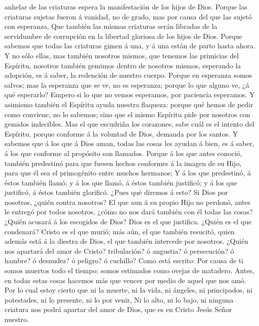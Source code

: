 anhelar de las criaturas espera la manifestación de los hijos de Dios.
 Porque las criaturas sujetas fueron á vanidad, no de
grado, mas por causa del que las sujetó con esperanza, 
Que también las mismas criaturas serán libradas de la servidumbre de
corrupción en la libertad gloriosa de los hijos de Dios. 
Porque sabemos que todas las criaturas gimen á una, y á una están de
parto hasta ahora.  Y no sólo ellas, mas también nosotros
mismos, que tenemos las primicias del Espíritu, nosotros también gemimos
dentro de nosotros mismos, esperando la adopción, es á saber, la
redención de nuestro cuerpo.  Porque en esperanza somos
salvos; mas la esperanza que se ve, no es esperanza; porque lo que
alguno ve, ¿á qué esperarlo?  Empero si lo que no vemos
esperamos, por paciencia esperamos.  Y asimismo también
el Espíritu ayuda nuestra flaqueza: porque qué hemos de pedir como
conviene, no lo sabemos; sino que el mismo Espíritu pide por nosotros
con gemidos indecibles.  Mas el que escudriña los
corazones, sabe cuál es el intento del Espíritu, porque conforme á la
voluntad de Dios, demanda por los santos.  Y sabemos que
á los que á Dios aman, todas las cosas les ayudan á bien, es á saber, á
los que conforme al propósito son llamados.  Porque á los
que antes conoció, también predestinó para que fuesen hechos conformes á
la imagen de su Hijo, para que él sea el primogénito entre muchos
hermanos;  Y á los que predestinó, á éstos también llamó;
y á los que llamó, á éstos también justificó; y á los que justificó, á
éstos también glorificó.  ¿Pues qué diremos á esto? Si
Dios por nosotros, ¿quién contra nosotros?  El que aun á
su propio Hijo no perdonó, antes le entregó por todos nosotros, ¿cómo no
nos dará también con él todas las cosas?  ¿Quién acusará
á los escogidos de Dios? Dios es el que justifica. 
¿Quién es el que condenará? Cristo es el que murió; más aún, el que
también resucitó, quien además está á la diestra de Dios, el que también
intercede por nosotros.  ¿Quién nos apartará del amor de
Cristo? tribulación? ó angustia? ó persecución? ó hambre? ó desnudez? ó
peligro? ó cuchillo?  Como está escrito: Por causa de ti
somos muertos todo el tiempo: somos estimados como ovejas de matadero.
 Antes, en todas estas cosas hacemos más que vencer por
medio de aquel que nos amó.  Por lo cual estoy cierto que
ni la muerte, ni la vida, ni ángeles, ni principados, ni potestades, ni
lo presente, ni lo por venir,  Ni lo alto, ni lo bajo, ni
ninguna criatura nos podrá apartar del amor de Dios, que es en Cristo
Jesús Señor nuestro.

